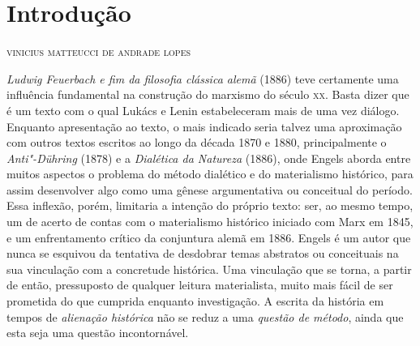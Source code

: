 \chapter[Introdução]{Introdução }

\begin{flushright}
\textsc{vinicius matteucci de andrade lopes}
\end{flushright}

\noindent{}\emph{Ludwig Feuerbach e fim da filosofia clássica alemã} (1886) teve
certamente uma influência fundamental na construção do marxismo do
século \textsc{xx}. Basta dizer que é um texto com o qual Lukács e Lenin
estabeleceram mais de uma vez diálogo. Enquanto apresentação ao texto, o
mais indicado seria talvez uma aproximação com outros textos escritos ao
longo da década 1870 e 1880, principalmente o \emph{Anti"-Dühring} (1878)
e a \emph{Dialética da Natureza} (1886), onde Engels aborda entre muitos
aspectos o problema do método dialético e do materialismo histórico,
para assim desenvolver algo como uma gênese argumentativa ou conceitual
do período. Essa inflexão, porém, limitaria a intenção do próprio texto:
ser, ao mesmo tempo, um de acerto de contas com o materialismo histórico
iniciado com Marx em 1845, e um enfrentamento crítico da conjuntura
alemã em 1886. Engels é um autor que nunca se esquivou da tentativa de
desdobrar temas abstratos ou conceituais na sua vinculação com a
concretude histórica. Uma vinculação que se torna, a partir de então,
pressuposto de qualquer leitura materialista, muito mais fácil de ser
prometida do que cumprida enquanto investigação. A escrita da história
em tempos de \emph{alienação histórica} não se reduz a uma \emph{questão
de método}, ainda que esta seja uma questão incontornável.

